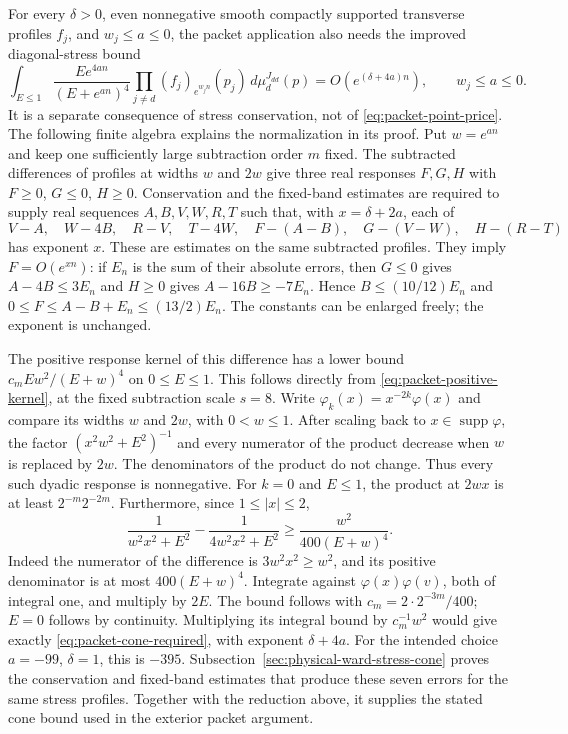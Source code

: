 For every $\delta>0$, even nonnegative smooth compactly supported
transverse profiles $f_j$, and $w_j\leq a\leq0$, the packet application
also needs the improved diagonal-stress bound
\begin{equation}\label{eq:packet-cone-required}
 \int_{E\leq1}\frac{E e^{4an}}{(E+e^{an})^4}
             \prod_{j\ne d}(f_j)_{e^{w_jn}}(p_j)\,d\mu_d^{J_{dd}}(p)
       =O(e^{(\delta+4a)n}),\qquad w_j\leq a\leq0.
\end{equation}
It is a separate consequence of stress conservation, not of
\eqref{eq:packet-point-price}. The following finite algebra explains the
normalization in its proof. Put $w=e^{an}$ and keep one sufficiently large
subtraction order $m$ fixed. The subtracted differences of profiles at
widths $w$ and $2w$ give three real responses $F,G,H$ with
$F\geq0$, $G\leq0$, $H\geq0$. Conservation and the fixed-band estimates
are required to supply real sequences $A,B,V,W,R,T$ such that, with
$x=\delta+2a$, each of
\[
 V-A,\quad W-4B,\quad R-V,\quad T-4W,\quad
 F-(A-B),\quad G-(V-W),\quad H-(R-T)
\]
has exponent $x$. These are estimates on the same subtracted profiles.
They imply $F=O(e^{xn})$: if $E_n$ is the sum of their absolute errors,
then $G\leq0$ gives $A-4B\leq3E_n$ and $H\geq0$ gives
$A-16B\geq-7E_n$. Hence $B\leq(10/12)E_n$ and
$0\leq F\leq A-B+E_n\leq(13/2)E_n$.
The constants can be enlarged freely; the exponent is unchanged.

The positive response kernel of this difference has a lower bound
$c_m E w^2/(E+w)^4$ on $0\leq E\leq1$. This follows directly from
\eqref{eq:packet-positive-kernel}, at the fixed subtraction scale $s=8$.
Write $\varphi_k(x)=x^{-2k}\varphi(x)$ and compare its widths $w$ and
$2w$, with $0<w\leq1$. After scaling back to $x\in\operatorname{supp}
\varphi$, the factor $(x^2w^2+E^2)^{-1}$ and every numerator of the
product decrease when $w$ is replaced by $2w$. The denominators of the
product do not change. Thus every such dyadic response is nonnegative.
For $k=0$ and $E\leq1$, the product at $2wx$ is at least
$2^{-m}2^{-2m}$. Furthermore, since $1\leq|x|\leq2$,
\[
 \frac1{w^2x^2+E^2}-\frac1{4w^2x^2+E^2}
 \geq\frac{w^2}{400(E+w)^4}.
\]
Indeed the numerator of the difference is $3w^2x^2\geq w^2$, and
its positive denominator is at most $400(E+w)^4$.
Integrate against $\varphi(x)\varphi(v)$, both of integral one, and
multiply by $2E$. The bound follows with
$c_m=2\cdot2^{-3m}/400$; $E=0$ follows by continuity.
Multiplying its integral bound
by $c_m^{-1}w^2$ would give exactly
\eqref{eq:packet-cone-required}, with exponent $\delta+4a$.
For the intended choice $a=-99$, $\delta=1$, this is $-395$.
Subsection~\ref{sec:physical-ward-stress-cone} proves the conservation and
fixed-band estimates that produce these seven errors for the same stress
profiles. Together with the reduction above, it supplies the stated cone
bound used in the exterior packet argument.
